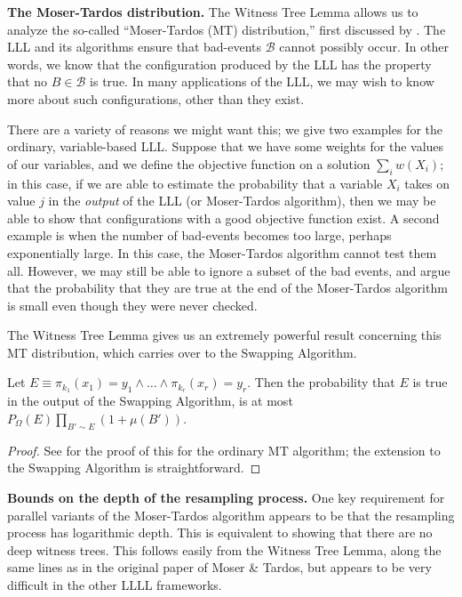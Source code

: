 \textbf{The Moser-Tardos distribution.} The Witness Tree Lemma allows us to analyze the so-called ``Moser-Tardos (MT) distribution,'' first discussed by \cite{haeupler}. The LLL and its algorithms ensure that bad-events $\mathcal B$ cannot possibly occur. In other words, we know that the configuration produced by the LLL has the property that no $B \in \mathcal B$ is true. In many applications of the LLL, we may wish to know more about such configurations, other than they exist.

 There are a variety of reasons we might want this; we give two examples for the ordinary, variable-based LLL. Suppose that we have some weights for the values of our variables, and we define the objective function on a solution $\sum_i w(X_i)$; in this case, if we are able to estimate the probability that a variable $X_i$ takes on value $j$ in the \emph{output} of the LLL (or Moser-Tardos algorithm), then we may be able to show that configurations with a good objective function exist. A second example is when the number of bad-events becomes too large, perhaps exponentially large. In this case, the Moser-Tardos algorithm cannot test them all. However, we may still be able to ignore a subset of the bad events, and argue that the probability that they are true at the end of the Moser-Tardos algorithm is small even though they were never checked. 

The Witness Tree Lemma gives us an extremely powerful result concerning this MT distribution, which carries over to the Swapping Algorithm.
\begin{proposition}
Let $E \equiv \pi_{k_1}(x_1) = y_1 \wedge \dots \wedge \pi_{k_r}(x_r) = y_r$. Then the probability that $E$ is true in the output of the Swapping Algorithm, is at most $P_{\Omega}(E) \prod_{B' \sim E} (1 + \mu(B'))$.
\end{proposition}
\begin{proof}
See \cite{haeupler} for the proof of this for the ordinary MT algorithm; the extension to the Swapping Algorithm is straightforward.
\end{proof}

\textbf{Bounds on the depth of the resampling process.} One key requirement for parallel variants of the Moser-Tardos algorithm appears to be that the resampling process has logarithmic depth. This is equivalent to showing that there are no deep witness trees. This follows easily from the Witness Tree Lemma, along the same lines as in the original paper of Moser \& Tardos, but appears to be very difficult in the other LLLL frameworks.

